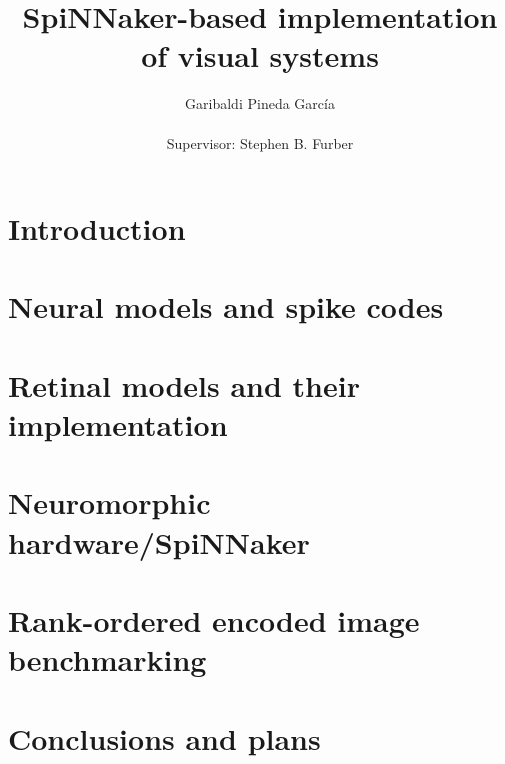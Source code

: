 \documentclass[12pt,a4paper,oneside]{report}
\title{SpiNNaker-based implementation of visual systems}
\author{Garibaldi Pineda Garc\'ia \\ \\ Supervisor: Stephen B. Furber}
\date{}
\begin{document}
\begingroup
\renewcommand{\newpage}{}
\maketitle

\endgroup

\begingroup
\let\cleardoublepage\clearpage
\tableofcontents
\endgroup

\chapter{Introduction}

\chapter{Neural models and spike codes}

\chapter{Retinal models and their implementation}

\chapter{Neuromorphic hardware/SpiNNaker}

\chapter{Rank-ordered encoded image benchmarking}

\chapter{Conclusions and plans}




\end{document}
